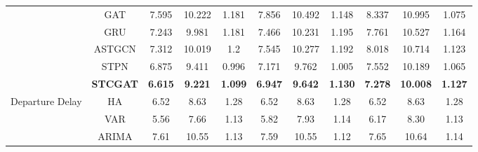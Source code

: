 \documentclass[12pt,a4paper]{report}
\begin{document}
\begin{table}[h]
\begin{tabular}{ccccccccccc}
                                          & GAT             & 7.595                        & 10.222                     & \multicolumn{1}{c|}{1.181}          & 7.856          & 10.492         & \multicolumn{1}{c|}{1.148}          & 8.337          & 10.995          & 1.075          \\
                                          & GRU             & 7.243                        & 9.981                      & \multicolumn{1}{c|}{1.181}          & 7.466          & 10.231         & \multicolumn{1}{c|}{1.195}          & 7.761          & 10.527          & 1.164          \\
                                          & ASTGCN          & 7.312                        & 10.019                     & \multicolumn{1}{c|}{1.2}            & 7.545          & 10.277         & \multicolumn{1}{c|}{1.192}          & 8.018          & 10.714          & 1.123          \\
                                          & STPN            & 6.875                        & 9.411                      & \multicolumn{1}{c|}{0.996}          & 7.171          & 9.762          & \multicolumn{1}{c|}{1.005}          & 7.552          & 10.189          & 1.065          \\
                                          & \textbf{STCGAT} & \textbf{6.615}               & \textbf{9.221}             & \multicolumn{1}{c|}{\textbf{1.099}} & \textbf{6.947} & \textbf{9.642} & \multicolumn{1}{c|}{\textbf{1.130}} & \textbf{7.278} & \textbf{10.008} & \textbf{1.127} \\\midrule
        \multirow{11}{*}{Departure Delay} & HA              & 6.52                         & 8.63                       & \multicolumn{1}{c|}{1.28}           & 6.52           & 8.63           & \multicolumn{1}{c|}{1.28}           & 6.52           & 8.63            & 1.28           \\
                                          & VAR             & 5.56                         & 7.66                       & \multicolumn{1}{c|}{1.13}           & 5.82           & 7.93           & \multicolumn{1}{c|}{1.14}           & 6.17           & 8.30            & 1.13           \\
                                          & ARIMA           & 7.61                         & 10.55                      & \multicolumn{1}{c|}{1.13}           & 7.59           & 10.55          & \multicolumn{1}{c|}{1.12}           & 7.65           & 10.64           & 1.14           \\

\end{tabular}
\end{table}
\end{document}
